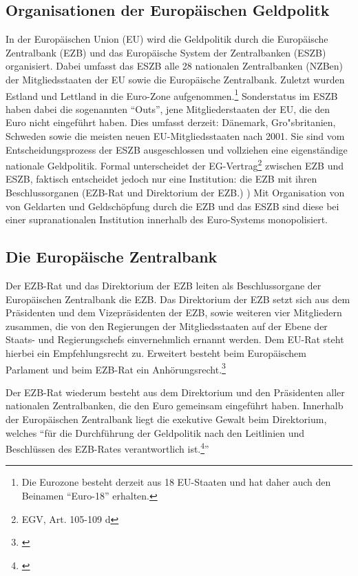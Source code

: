 \documentclass[
  onecolumn,
  a4paper,
  abstracton,
  parskip=half
  ,final
  ]{scrartcl}
\begin{document}
\subsection{Organisationen der Europ{\"a}ischen Geldpolitk}

In der Europ{\"a}ischen Union (EU) wird die Geldpolitik durch die Europ{\"a}ische Zentralbank (EZB) und das Europ{\"a}ische System der Zentralbanken (ESZB) organisiert. Dabei umfasst das ESZB alle 28 nationalen Zentralbanken (NZBen) der Mitgliedsstaaten der EU sowie die Europ{\"a}ische Zentralbank. Zuletzt wurden Estland und Lettland in die Euro-Zone aufgenommen.\footnote[98]{Die Eurozone besteht derzeit aus 18 EU-Staaten und hat daher auch den Beinamen  "`Euro-18"' erhalten.} Sonderstatus im ESZB haben dabei die sogenannten "`Outs"', jene Mitgliederstaaten der EU, die den Euro nicht eingef{\"u}hrt haben.
Dies umfasst derzeit: D{\"a}nemark, Gro{"s}britanien, Schweden sowie die meisten neuen EU-Mitgliedsstaaten nach 2001. Sie sind vom Entscheidungsprozess der ESZB ausgeschlossen und vollziehen eine eigenst{\"a}ndige nationale Geldpolitik.
Formal unterscheidet der EG-Vertrag\footnote[25]{EGV, Art. 105-109 d} zwischen EZB und ESZB, faktisch entscheidet jedoch nur eine Institution: die EZB mit ihren Beschlussorganen (EZB-Rat und Direktorium der EZB.) \citep[vgl.][S.553]{Basseler2010})
Mit Organisation von von Geldarten und Geldsch{\"o}pfung durch die EZB und das ESZB sind diese bei einer supranationalen Institution innerhalb des Euro-Systems monopolisiert.



\subsection{Die Europ{\"a}ische Zentralbank}

Der EZB-Rat und das Direktorium der EZB leiten als Beschlussorgane der Europ{\"a}ischen Zentralbank die EZB. Das Direktorium der EZB setzt sich aus dem Pr{\"a}sidenten und dem Vizepr{\"a}sidenten der EZB, sowie weiteren vier Mitgliedern zusammen, die von den Regierungen der Mitgliedsstaaten auf der Ebene der Staats- und Regierungschefs einvernehmlich ernannt werden. Dem EU-Rat steht hierbei ein Empfehlungsrecht zu. Erweitert besteht beim Europ{\"a}ischem Parlament und beim EZB-Rat ein Anh{\"o}rungsrecht.\footnote[46]{\citep[vgl.][S.553]{Basseler2010}}

Der EZB-Rat wiederum besteht aus dem Direktorium und den Pr{\"a}sidenten aller nationalen Zentralbanken, die den Euro gemeinsam eingef{\"u}hrt haben. Innerhalb der Europ{\"a}ischen Zentralbank liegt die exekutive Gewalt beim Direktorium, welches "`f{\"u}r die Durchf{\"u}hrung der Geldpolitik nach den Leitlinien und Beschl{\"u}ssen des EZB-Rates verantwortlich ist.\footnote[47]{\citep[S.553]{Basseler2010}}"'
\end{document}
